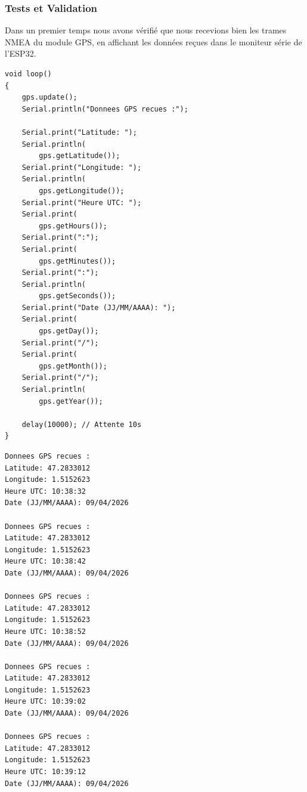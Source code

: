 \subsubsection*{Tests et Validation}

Dans un premier temps nous avons vérifié que nous recevions bien les trames NMEA du module GPS, en affichant les données 
reçues dans le moniteur série de l'ESP32.
\\

\noindent
\begin{minipage}[t]{0.45\textwidth}
\begin{lstlisting}[style=CStyle, caption={Exemple utilisation module GPS}, label={lst:gps_exemple}]
void loop()
{
    gps.update();
    Serial.println("Donnees GPS recues :");

    Serial.print("Latitude: ");
    Serial.println(
        gps.getLatitude());
    Serial.print("Longitude: ");
    Serial.println(
        gps.getLongitude());
    Serial.print("Heure UTC: ");
    Serial.print(
        gps.getHours());
    Serial.print(":");
    Serial.print(
        gps.getMinutes());
    Serial.print(":");
    Serial.println(
        gps.getSeconds());
    Serial.print("Date (JJ/MM/AAAA): ");
    Serial.print(
        gps.getDay());
    Serial.print("/");
    Serial.print(
        gps.getMonth());
    Serial.print("/");
    Serial.println(
        gps.getYear());

    delay(10000); // Attente 10s 
}
\end{lstlisting}
\end{minipage}
\hfill
\begin{minipage}[t]{0.45\textwidth}
\begin{lstlisting}[style=CStyle, caption={Moniteur Série de l'ESP32}, label={lst:moniteur_exemple}]
Donnees GPS recues :
Latitude: 47.2833012
Longitude: 1.5152623
Heure UTC: 10:38:32
Date (JJ/MM/AAAA): 09/04/2026

Donnees GPS recues :
Latitude: 47.2833012
Longitude: 1.5152623
Heure UTC: 10:38:42
Date (JJ/MM/AAAA): 09/04/2026

Donnees GPS recues :
Latitude: 47.2833012
Longitude: 1.5152623
Heure UTC: 10:38:52
Date (JJ/MM/AAAA): 09/04/2026

Donnees GPS recues :
Latitude: 47.2833012
Longitude: 1.5152623
Heure UTC: 10:39:02
Date (JJ/MM/AAAA): 09/04/2026

Donnees GPS recues :
Latitude: 47.2833012
Longitude: 1.5152623
Heure UTC: 10:39:12
Date (JJ/MM/AAAA): 09/04/2026
\end{lstlisting}
\end{minipage}

